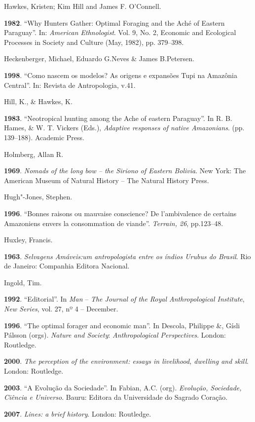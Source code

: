\begin{Parskip}
Hawkes, Kristen; Kim Hill and James F. O'Connell.

\textbf{1982}. ``Why Hunters Gather: Optimal Foraging and the Aché of
Eastern Paraguay''. In: \emph{American Ethnologist}. Vol. 9, No. 2,
Economic and Ecological Processes in Society and Culture (May, 1982),
pp. 379--398.

Heckenberger, Michael, Eduardo G.Neves \& James B.Petersen.

\textbf{1998}. ``Como nascem os modelos? As origens e expansões Tupi na
Amazônia Central''. In: Revista de Antropologia, v.41.

Hill, K., \& Hawkes, K.

\textbf{1983}. ``Neotropical hunting among the Ache of eastern
Paraguay''. In R. B. Hames, \& W. T. Vickers (Eds.), \emph{Adaptive
responses of native Amazonians}. (pp. 139--188). Academic Press.

Holmberg, Allan R.

\textbf{1969}. \emph{Nomads of the long bow -- the Siriono of Eastern
Bolivia}. New York: The American Museum of Natural History -- The
Natural History Press.

Hugh"-Jones, Stephen.

\textbf{1996}. ``Bonnes raisons ou mauvaise conscience? De l'ambivalence
de certains Amazoniens envers la consommation de viande''. \emph{Terrain,
26}, pp.123--48.

Huxley, Francis.

\textbf{1963}. \emph{Selvagens Amáveis:um antropologista entre os índios
Urubus do Brasil}. Rio de Janeiro: Companhia Editora Nacional.

Ingold, Tim.

\textbf{1992}. ``Editorial''. In \emph{Man} -- \emph{The Journal of the
Royal Anthropological Institute}, \emph{New Series}, vol. 27, nº 4 --
December.

\textbf{1996}. ``The optimal forager and economic man''. In Descola,
Philippe \&, Gísli Pálsson (orgs). \emph{Nature and Society}:
\emph{Anthropological Perspectives}. London: Routledge.

\textbf{2000}. \emph{The perception of the environment: essays in
livelihood, dwelling and skill}. London: Routledge.

\textbf{2003}. ``A Evolução da Sociedade''. In Fabian, A.C. (org).
\emph{Evolução, Sociedade, Ciência e Universo}. Bauru: Editora da
Universidade do Sagrado Coração.

\textbf{2007}. \emph{Lines: a brief history}. London: Routledge.


\end{Parskip}
